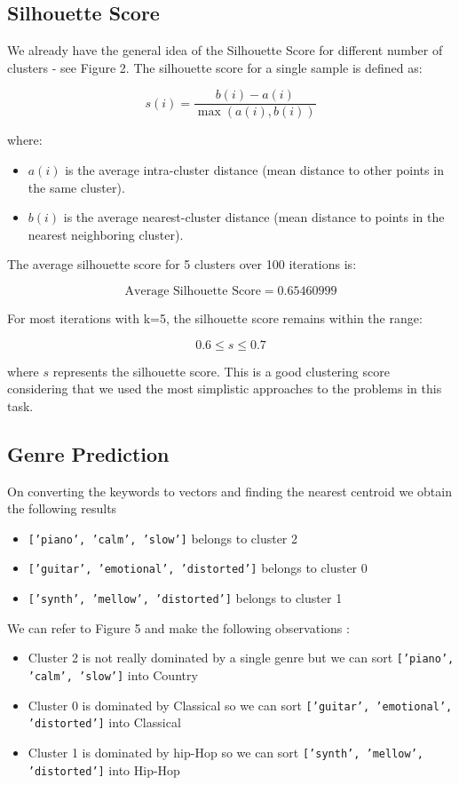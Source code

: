 \documentclass{article}
\begin{document}
\subsection{Silhouette Score}
We already have the general idea of the Silhouette Score for different number of clusters - see Figure 2.
The silhouette score for a single sample is defined as:

\[
s(i) = \frac{b(i) - a(i)}{\max(a(i), b(i))}
\]

where:
\begin{itemize}
    \item \( a(i) \) is the average intra-cluster distance (mean distance to other points in the same cluster).
    \item \( b(i) \) is the average nearest-cluster distance (mean distance to points in the nearest neighboring cluster).
\end{itemize}

The average silhouette score for 5 clusters over 100 iterations is:

\[
\text{Average Silhouette Score} = 0.65460999
\]

For most iterations with k=5, the silhouette score remains within the range:

\[
0.6 \leq s \leq 0.7
\]

where \( s \) represents the silhouette score.
This is a good clustering score considering that we used the most simplistic approaches to the problems in this task.

\subsection{Genre Prediction}
On converting the keywords to vectors and finding the nearest centroid we obtain the following results
\begin{itemize}
    \item \texttt{['piano', 'calm', 'slow']} belongs to cluster 2
    \item \texttt{['guitar', 'emotional', 'distorted']} belongs to cluster 0
    \item \texttt{['synth', 'mellow', 'distorted']} belongs to cluster 1
\end{itemize}
\pagebreak
We can refer to Figure 5 and make the following observations : 
\begin{itemize}
\item Cluster 2 is not really dominated by a single genre but we can sort \texttt{['piano', 'calm', 'slow']} into Country
\item Cluster 0 is dominated by Classical so we can sort \texttt{['guitar', 'emotional', 'distorted']} into Classical
\item Cluster 1 is dominated by hip-Hop so we can sort \texttt{['synth', 'mellow', 'distorted']} into Hip-Hop
\end{itemize}
\end{document}
